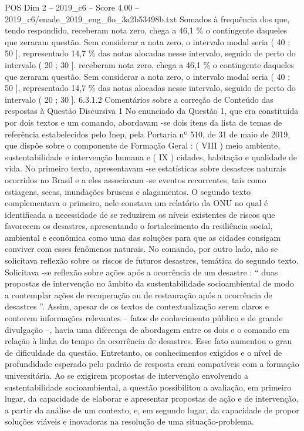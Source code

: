\begin{textsample}{POS Dim 2 – 2019\_c6 – Score 4.00 – 2019\_c6/enade\_2019\_eng\_flo\_3a2b53498b.txt}
Somados à frequência dos que, tendo respondido, receberam nota zero, chega a 46,1 \% o contingente daqueles que zeraram questão.
Sem considerar a nota zero, o intervalo modal seria ( 40 ; 50 ], representado 14,7 \% das notas alocadas nesse intervalo, seguido de perto do intervalo ( 20 ; 30 ]. receberam nota zero, chega a 46,1 \% o contingente daqueles que zeraram questão.
Sem considerar a nota zero, o intervalo modal seria ( 40 ; 50 ], representado 14,7 \% das notas alocadas nesse intervalo, seguido de perto do intervalo ( 20 ; 30 ]. 6.3.1.2 Comentários sobre a correção de Conteúdo das respostas à Questão Discursiva 1 No enunciado da Questão 1, que era constituída por dois textos e um comando, abordavam -se dois itens da lista de temas de referência estabelecidos pelo Inep, pela Portaria nº 510, de 31 de maio de 2019, que dispõe sobre o componente de Formação Geral : ( VIII ) meio ambiente, sustentabilidade e intervenção humana e ( IX ) cidades, habitação e qualidade de vida.
No primeiro texto, apresentavam -se estatísticas sobre desastres naturais ocorridos no Brasil e a eles associavam -se eventos recorrentes, tais como estiagens, secas, inundações bruscas e alagamentos.
O segundo texto complementava o primeiro, nele constava um relatório da ONU no qual é identificada a necessidade de se reduzirem os níveis existentes de riscos que favorecem os desastres, apresentando o fortalecimento da resiliência social, ambiental e econômica como uma das soluções para que as cidades consigam conviver com esses fenômenos naturais.
No comando, por outro lado, não se solicitava reflexão sobre os riscos de futuros desastres, temática do segundo texto.
Solicitava -se reflexão sobre ações após a ocorrência de um desastre : “ duas propostas de intervenção no âmbito da sustentabilidade socioambiental de modo a contemplar ações de recuperação ou de restauração após a ocorrência de desastres ”.
Assim, apesar de os textos de contextualização serem claros e conterem informações relevantes – fatos de conhecimento público e de grande divulgação –, havia uma diferença de abordagem entre os dois e o comando em relação à linha do tempo da ocorrência de desastres.
Esse fato aumentou o grau de dificuldade da questão.
Entretanto, os conhecimentos exigidos e o nível de profundidade esperado pelo padrão de resposta eram compatíveis com a formação universitária.
Ao se exigirem propostas de intervenção envolvendo a sustentabilidade socioambiental, a questão possibilitou a avaliação, em primeiro lugar, da capacidade de elaborar e apresentar propostas de ação e de intervenção, a partir da análise de um contexto, e, em segundo lugar, da capacidade de propor soluções viáveis e inovadoras na resolução de uma situação-problema.

\end{textsample}
